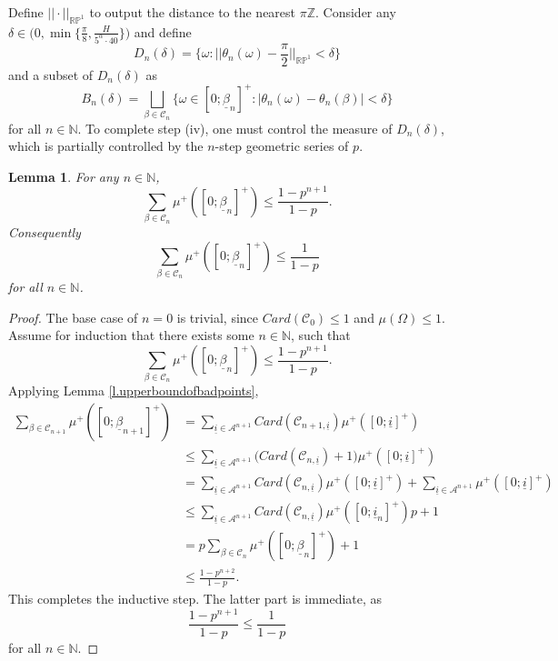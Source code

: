 \documentclass{amsart}
\newtheorem{lemma}{Lemma}
\newcommand{\NN}{\mathbb{N}}
\newcommand{\PP}{\mathbb{P}}
\newcommand{\RR}{\mathbb{R}}
\newcommand{\ZZ}{\mathbb{Z}}
\newcommand{\A}{\mathcal{A}}
\newcommand{\C}{\mathcal{C}}
\begin{document}
Define $||\cdot||_{\RR\PP^1}$ to output the distance to the nearest $\pi \ZZ$. Consider any $\delta\in\Big(0, \min\{\frac{\pi}{8}, \frac{H}{5^\alpha \cdot 40}\}\Big)$ and define
\[D_n(\delta) = \{\omega: ||\theta_n(\omega) - \frac{\pi}{2}||_{\RR\PP^1} < \delta\}\]
and a subset of $D_n(\delta)$ as
\[B_n(\delta) = \bigsqcup_{\beta \in \C_n} \{\omega\in [0;\underline{\beta}_n]^+: |\theta_n(\omega) -\theta_n(\beta)| < \delta\}\]
for all $n\in \NN$. To complete step (iv), one must control the measure of $D_n(\delta)$, which is partially controlled by the $n$-step geometric series of $p$. 

\begin{lemma}\label{l.boundsum}
    For any $n\in \NN$,
    \[\sum_{\beta\in \C_n} \mu^+([0;\underline{\beta}_n]^+) \leq \frac{1-p^{n+1}}{1-p}.\]
    Consequently 
    \[\sum_{\beta\in \C_n} \mu^+([0;\underline{\beta}_n]^+) \leq \frac{1}{1-p}\]
    for all $n\in \NN$.
\end{lemma}
\begin{proof}
    The base case of $n=0$ is trivial, since $Card(\C_0)\leq 1$ and $\mu(\Omega)\leq 1$. Assume for induction that there exists some $n\in \NN$, such that
    \[\sum_{\beta\in \C_n} \mu^+([0;\underline{\beta}_n]^+) \leq \frac{1-p^{n+1}}{1-p}.\]
    Applying Lemma \ref{l.upperboundofbadpoints}, 
    \begin{align*}
        \sum_{\beta\in \C_{n+1}} \mu^+([0;\underline{\beta}_{n+1}]^+) &= \sum_{\underline{i}\in \A^{n+1}} Card(\C_{n+1,\underline{i}}) \mu^+([0;\underline{i}]^+)\\
        &\leq \sum_{\underline{i}\in \A^{n+1}} \Big(Card(\C_{n,\underline{i}}) + 1\Big) \mu^+([0;\underline{i}]^+)\\
        &= \sum_{\underline{i}\in \A^{n+1}} Card(\C_{n,\underline{i}})\mu^+([0;\underline{i}]^+) +  \sum_{\underline{i}\in \A^{n+1}} \mu^+([0;\underline{i}]^+)\\
        &\leq \sum_{\underline{i}\in \A^{n+1}} Card(\C_{n,\underline{i}})\mu^+([0;\underline{i}_n]^+)p + 1\\
        &= p \sum_{\beta\in \C_n} \mu^+([0;\underline{\beta}_n]^+) +1\\
        &\leq \frac{1-p^{n+2}}{1-p}.
    \end{align*}
    This completes the inductive step. The latter part is immediate, as
    \[\frac{1-p^{n+1}}{1-p}\leq \frac{1}{1-p}\]
    for all $n\in \NN$.
\end{proof}
\end{document}
